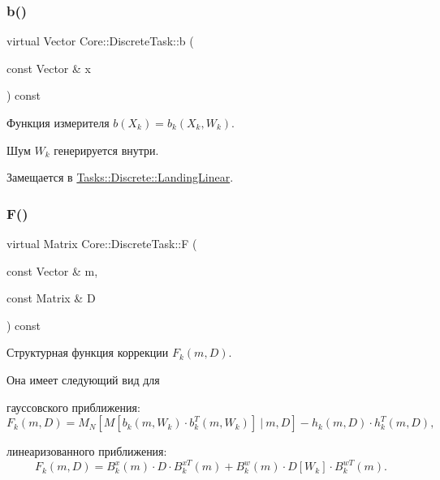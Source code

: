 \hypertarget{class_core_1_1_discrete_task_a82c1aa8100dd9211739f8fd9f7d52c81}{}\label{class_core_1_1_discrete_task_a82c1aa8100dd9211739f8fd9f7d52c81} 
\subsubsection{\texorpdfstring{b()}{b()}}
{\footnotesize\ttfamily virtual Vector Core\+::\+Discrete\+Task\+::b (\begin{DoxyParamCaption}\item[{const Vector \&}]{x }\end{DoxyParamCaption}) const\hspace{0.3cm}{\ttfamily [pure virtual]}}



Функция измерителя $b(X_k) = b_k(X_k, W_k)$. 

Шум $W_k$ генерируется внутри. 

Замещается в \hyperlink{class_tasks_1_1_discrete_1_1_landing_linear_a599d3491da6d84ba68c43433235e9980}{Tasks\+::\+Discrete\+::\+Landing\+Linear}.

\hypertarget{class_core_1_1_discrete_task_ac55ca2cd47f0c9f7e5d3d3704becee46}{}\label{class_core_1_1_discrete_task_ac55ca2cd47f0c9f7e5d3d3704becee46} 
\subsubsection{\texorpdfstring{F()}{F()}}
{\footnotesize\ttfamily virtual Matrix Core\+::\+Discrete\+Task\+::F (\begin{DoxyParamCaption}\item[{const Vector \&}]{m,  }\item[{const Matrix \&}]{D }\end{DoxyParamCaption}) const\hspace{0.3cm}{\ttfamily [pure virtual]}}



Структурная функция коррекции $F_k(m, D)$. 

Она имеет следующий вид для


\begin{DoxyItemize}
\item гауссовского приближения\+: \[F_k(m, D) = M_N[M[b_k(m, W_k)\cdot b_k^T(m, W_k)] \ |\ m, D] - h_k(m,D) \cdot h_k^T(m, D),\]
\item линеаризованного приближения\+: \[F_k(m, D) = B_k^x(m) \cdot D \cdot B_k^{xT}(m) + B_k^w(m) \cdot D[W_k] \cdot B_k^{wT}(m).\]
\end{DoxyItemize}

